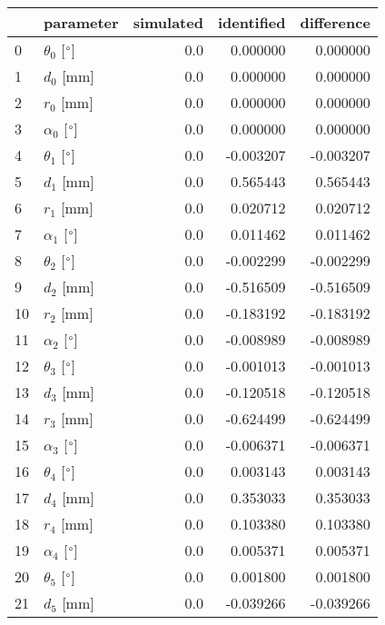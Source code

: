 \documentclass{standalone}%
\begin{document}
%
\normalsize%
\begin{tabular}{llrrr}
\toprule
{} &                 parameter & simulated & identified & difference \\
\midrule
0  &  $\theta_{0}$ [$\degree$] &       0.0 &   0.000000 &   0.000000 \\
1  &              $d_{0}$ [mm] &       0.0 &   0.000000 &   0.000000 \\
2  &              $r_{0}$ [mm] &       0.0 &   0.000000 &   0.000000 \\
3  &  $\alpha_{0}$ [$\degree$] &       0.0 &   0.000000 &   0.000000 \\
4  &  $\theta_{1}$ [$\degree$] &       0.0 &  -0.003207 &  -0.003207 \\
5  &              $d_{1}$ [mm] &       0.0 &   0.565443 &   0.565443 \\
6  &              $r_{1}$ [mm] &       0.0 &   0.020712 &   0.020712 \\
7  &  $\alpha_{1}$ [$\degree$] &       0.0 &   0.011462 &   0.011462 \\
8  &  $\theta_{2}$ [$\degree$] &       0.0 &  -0.002299 &  -0.002299 \\
9  &              $d_{2}$ [mm] &       0.0 &  -0.516509 &  -0.516509 \\
10 &              $r_{2}$ [mm] &       0.0 &  -0.183192 &  -0.183192 \\
11 &  $\alpha_{2}$ [$\degree$] &       0.0 &  -0.008989 &  -0.008989 \\
12 &  $\theta_{3}$ [$\degree$] &       0.0 &  -0.001013 &  -0.001013 \\
13 &              $d_{3}$ [mm] &       0.0 &  -0.120518 &  -0.120518 \\
14 &              $r_{3}$ [mm] &       0.0 &  -0.624499 &  -0.624499 \\
15 &  $\alpha_{3}$ [$\degree$] &       0.0 &  -0.006371 &  -0.006371 \\
16 &  $\theta_{4}$ [$\degree$] &       0.0 &   0.003143 &   0.003143 \\
17 &              $d_{4}$ [mm] &       0.0 &   0.353033 &   0.353033 \\
18 &              $r_{4}$ [mm] &       0.0 &   0.103380 &   0.103380 \\
19 &  $\alpha_{4}$ [$\degree$] &       0.0 &   0.005371 &   0.005371 \\
20 &  $\theta_{5}$ [$\degree$] &       0.0 &   0.001800 &   0.001800 \\
21 &              $d_{5}$ [mm] &       0.0 &  -0.039266 &  -0.039266 \\

\end{tabular}
\end{document}
